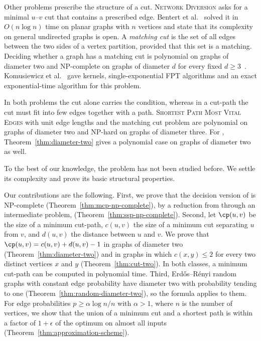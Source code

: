 Other problems prescribe the structure of a cut.
\textsc{Network Diversion} asks for a minimal $u$--$v$ cut that contains a prescribed edge.
Bentert et al.~\cite{Bentert2025NetworkDiversion} solved it in $O(n \log n)$ time on planar graphs with $n$ vertices and state that its complexity on general undirected graphs is open.
A \emph{matching cut} is the set of all edges between the two sides of a vertex partition, provided that this set is a matching.
Deciding whether a graph has a matching cut is polynomial on graphs of diameter two and NP-complete on graphs of diameter $d$ for every fixed $d \geq 3$~\cite{LeLe2019MatchingCut}.
Komusiewicz et al.~\cite{Komusiewicz2020MatchingCut} gave kernels, single-exponential FPT algorithms and an exact exponential-time algorithm for this problem.

In both problems the cut alone carries the condition, whereas in a cut-path the cut must fit into few edges together with a path.
\textsc{Shortest Path Most Vital Edges} with unit edge lengths and the matching cut problem are polynomial on graphs of diameter two and NP-hard on graphs of diameter three.
For \MinCutPath{}, Theorem~\ref{thm:diameter-two} gives a polynomial case on graphs of diameter two as well.

To the best of our knowledge, the problem has not been studied before.
We settle its complexity and prove its basic structural properties.

Our contributions are the following.
First, we prove that the decision version of \MinCutPath{} is NP-complete (Theorem~\ref{thm:mcp-np-complete}), by a reduction from \ThreeSAT{} through an intermediate problem, \SSP{} (Theorem~\ref{thm:ssp-np-complete}).
Second, let $\cp(u,v)$ be the size of a minimum cut-path, $c(u,v)$ the size of a minimum cut separating $u$ from $v$, and $d(u,v)$ the distance between $u$ and $v$.
We prove that $\cp(u,v) = c(u,v) + d(u,v) - 1$ in graphs of diameter two (Theorem~\ref{thm:diameter-two}) and in graphs in which $c(x,y) \leq 2$ for every two distinct vertices $x$ and $y$ (Theorem~\ref{thm:cut-two}).
In both classes, a minimum cut-path can be computed in polynomial time.
Third, Erdős–Rényi random graphs with constant edge probability have diameter two with probability tending to one (Theorem~\ref{thm:random-diameter-two}), so the formula applies to them.
For edge probabilities $p \geq \alpha \log n / n$ with $\alpha > 1$, where $n$ is the number of vertices, we show that the union of a minimum cut and a shortest path is within a factor of $1+\epsilon$ of the optimum on almost all inputs (Theorem~\ref{thm:approximation-scheme}).

